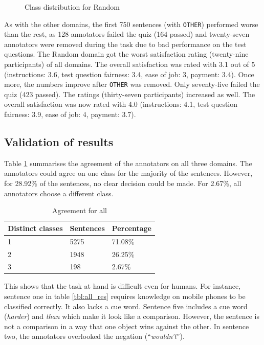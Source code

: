 \begin{figure}[h]
\centering
\caption{Class distribution for Random}
\label{fig:random_fin}
\end{figure}

As with the other domains, the first 750 sentences (with \texttt{OTHER}) performed worse than the rest, as 128 annotators failed the quiz (164 passed) and twenty-seven annotators were removed during the task due to bad performance on the test questions. The Random domain got the worst satisfaction rating (twenty-nine participants) of all domains. The overall satisfaction was rated with 3.1 out of 5 (instructions: 3.6, test question fairness: 3.4, ease of job: 3, payment: 3.4). Once more, the numbers improve after \texttt{OTHER} was removed. Only seventy-five failed the quiz (423 passed). The ratings (thirty-seven participants) increased as well. The overall satisfaction was now rated with 4.0 (instructions: 4.1, test question fairness: 3.9, ease of job: 4, payment: 3.7).


\subsection{Validation of results}

Table \ref{fig:all_agg} summarises the agreement of the annotators on all three domains. The annotators could agree on one class for the majority of the sentences. However, for 28.92\% of the sentences, no clear decision could be made. For 2.67\%, all annotators choose a different class. 

\begin{table}[h]
\caption{Agreement for all}
\label{fig:all_agg}
\begin{tabularx}{\textwidth}{XXX}
\toprule
Distinct classes & Sentences & Percentage \\
\midrule
1 & 5275 & 71.08\%\\
2 & 1948 & 26.25\%\\
3 & 198 & 2.67\%\\
\bottomrule
\end{tabularx}
\end{table}

This shows that the task at hand is difficult even for humans. For instance, sentence one in table \ref{tbl:all_res} requires knowledge on mobile phones to be classified correctly. It also lacks a cue word. Sentence five includes a cue word (\emph{harder}) and \emph{than} which make it look like a comparison. However, the sentence is not a comparison in a way that one object wins against the other. In sentence two, the annotators overlooked the negation (\enquote{\emph{wouldn't}}).

